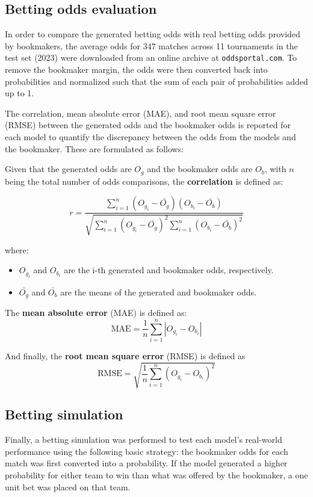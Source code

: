 \newcommand{\matchesBet}{347}
\newcommand{\tournamentsBet}{11}

\subsection{Betting odds evaluation}

In order to compare the generated betting odds with real betting odds provided by bookmakers, the average odds for \matchesBet{} matches across \tournamentsBet{} tournaments in the test set (2023) were downloaded from an online archive at \texttt{oddsportal.com}. To remove the bookmaker margin, the odds were then converted back into probabilities and normalized such that the sum of each pair of probabilities added up to 1.

The correlation, mean absolute error (MAE), and root mean square error (RMSE) between the generated odds and the bookmaker odds is reported for each model to quantify the discrepancy between the odds from the models and the bookmaker. These are formulated as follows:\label{bettingstats}

Given that the generated odds are $O_g$ and the bookmaker odds are $O_b$, with $n$ being the total number of odds comparisons, the \textbf{correlation} is defined as:

\[r = \frac{\sum_{i=1}^{n} (O_{g_i} - \bar{O_g})(O_{b_i} - \bar{O_b})}{\sqrt{\sum_{i=1}^{n} (O_{g_i} - \bar{O_g})^2 \sum_{i=1}^{n} (O_{b_i} - \bar{O_b})^2}}\]

where:
\begin{itemize}
	\item $O_{g_i}$ and $O_{b_i}$ are the i-th generated and bookmaker odds, respectively.
	\item $\bar{O_g}$ and $\bar{O_b}$ are the means of the generated and bookmaker odds.
\end{itemize}

The \textbf{mean absolute error} (MAE) is defined as:
\[\text{MAE} = \frac{1}{n} \sum_{i=1}^{n} |O_{g_i} - O_{b_i}|\]

And finally, the \textbf{root mean square error} (RMSE) is defined as
\[\text{RMSE} = \sqrt{\frac{1}{n} \sum_{i=1}^{n} (O_{g_i} - O_{b_i})^2}\]

\subsection{Betting simulation}

Finally, a betting simulation was performed to test each model's real-world performance using the following basic strategy: the bookmaker odds for each match was first converted into a probability. If the model generated a higher probability for either team to win than what was offered by the bookmaker, a one unit bet was placed on that team. 

